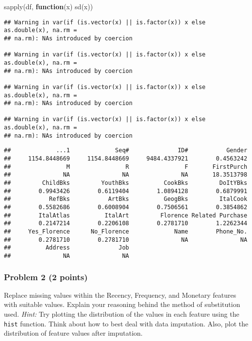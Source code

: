 \documentclass[
]{article}
\newenvironment{Shaded}{\begin{snugshade}}{\end{snugshade}}
\newcommand{\ControlFlowTok}[1]{\textcolor[rgb]{0.13,0.29,0.53}{\textbf{#1}}}
\newcommand{\FunctionTok}[1]{\textcolor[rgb]{0.00,0.00,0.00}{#1}}
\newcommand{\NormalTok}[1]{#1}
\begin{document}
\begin{Shaded}
\begin{Highlighting}[]
\FunctionTok{sapply}\NormalTok{(df, }\ControlFlowTok{function}\NormalTok{(x) }\FunctionTok{sd}\NormalTok{(x))}
\end{Highlighting}
\end{Shaded}

\begin{verbatim}
## Warning in var(if (is.vector(x) || is.factor(x)) x else as.double(x), na.rm =
## na.rm): NAs introduced by coercion

## Warning in var(if (is.vector(x) || is.factor(x)) x else as.double(x), na.rm =
## na.rm): NAs introduced by coercion

## Warning in var(if (is.vector(x) || is.factor(x)) x else as.double(x), na.rm =
## na.rm): NAs introduced by coercion

## Warning in var(if (is.vector(x) || is.factor(x)) x else as.double(x), na.rm =
## na.rm): NAs introduced by coercion
\end{verbatim}

\begin{verbatim}
##             ...1             Seq#              ID#           Gender 
##     1154.8448669     1154.8448669     9484.4337921        0.4563242 
##                M                R                F       FirstPurch 
##               NA               NA               NA       18.3513798 
##         ChildBks         YouthBks          CookBks         DoItYBks 
##        0.9943426        0.6119404        1.0894128        0.6879991 
##           RefBks           ArtBks          GeogBks         ItalCook 
##        0.5582686        0.6008904        0.7506561        0.3854862 
##        ItalAtlas          ItalArt         Florence Related Purchase 
##        0.2147214        0.2206108        0.2781710        1.2262344 
##     Yes_Florence      No_Florence             Name        Phone_No. 
##        0.2781710        0.2781710               NA               NA 
##          Address              Job 
##               NA               NA
\end{verbatim}

\hypertarget{problem-2-2-points}{%
\subsubsection{Problem 2 (2 points)}\label{problem-2-2-points}}

Replace missing values within the Recency, Frequency, and Monetary
features with suitable values. Explain your reasoning behind the method
of substitution used. \emph{Hint:} Try plotting the distribution of the
values in each feature using the \texttt{hist} function. Think about how
to best deal with data imputation. Also, plot the distribution of
feature values after imputation.
\end{document}

